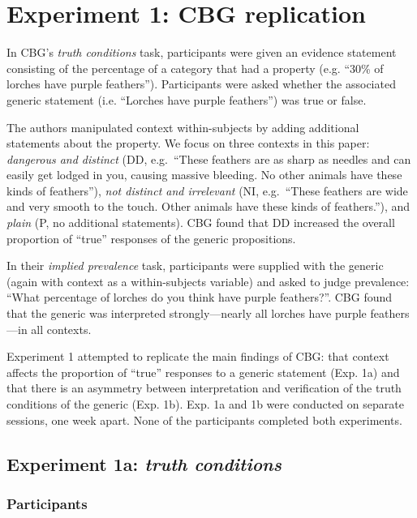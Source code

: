 \documentclass[10pt,letterpaper]{article}
\begin{document}
\section{Experiment 1: CBG replication}

In CBG's \emph{truth conditions} task, participants were given an evidence statement consisting of the percentage of a category that had a property (e.g. ``30\% of lorches have purple feathers''). Participants were asked whether the associated generic statement (i.e. ``Lorches have purple feathers'') was true or false. 

The authors manipulated context within-subjects by adding additional statements about the property. We focus on three contexts in this paper: \emph{dangerous and distinct} (DD, e.g.~``These feathers are as sharp as needles and can easily get lodged in you, causing massive bleeding. No other animals have these kinds of feathers''), \emph{not distinct and irrelevant} (NI, e.g.~``These feathers are wide and very smooth to the touch. Other animals have these kinds of feathers.''), and \emph{plain} (P, no additional statements). CBG found that DD increased the overall proportion of ``true'' responses of the generic propositions. 

In their \emph{implied prevalence} task, participants were supplied with the generic (again with context as a within-subjects variable) and asked to judge prevalence: ``What percentage of lorches do you think have purple feathers?''. CBG found that the generic was interpreted strongly---nearly all lorches have purple feathers---in all contexts. 

Experiment 1 attempted to replicate the main findings of CBG: that context affects the proportion of ``true'' responses to a generic statement (Exp. 1a) and that there is an asymmetry between interpretation and verification of the truth conditions of the generic (Exp. 1b). 
Exp. 1a and 1b were conducted on separate sessions, one week apart. None of the participants completed both experiments.

\subsection{Experiment 1a: \emph{truth conditions}}

\subsubsection{Participants}
\end{document}
